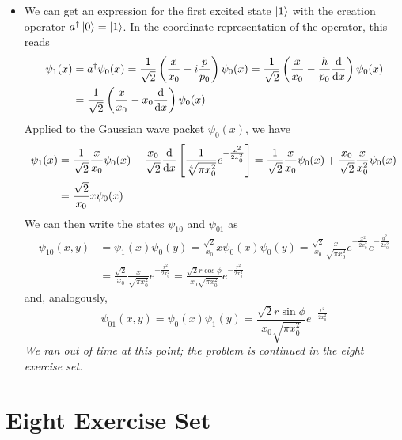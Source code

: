 \documentclass[11pt, a4paper]{article}
\begin{document}
\begin{itemize}
	\item We can get an expression for the first excited state $ \ket{1} $ with the creation operator $ a^{\dagger}\ket{0} = \ket{1} $. In the coordinate representation of the operator, this reads
	\begin{align*}
		\psi_{1}(x) &= a^{\dagger}\psi_{0}(x) = \frac{1}{\sqrt{2}}\left(\frac{x}{x_{0}}-i\frac{p}{p_{0}}\right)\psi_{0}(x)  = \frac{1}{\sqrt{2}}\left(\frac{x}{x_{0}}-\frac{\hbar}{p_{0}}\dv{x}\right)\psi_{0}(x) \\
		& = \frac{1}{\sqrt{2}}\left(\frac{x}{x_{0}}-x_{0}\dv{x}\right)\psi_{0}(x)
	\end{align*}
	Applied to the Gaussian wave packet $ \psi_{0}(x) $, we have
	\begin{align*}
		\psi_{1}(x) &= \frac{1}{\sqrt{2}}\frac{x}{x_{0}}\psi_{0}(x) - \frac{x_{0}}{\sqrt{2}}\dv{x}\left[\frac{1}{\sqrt[4]{\pi x_{0}^{2}}}e^{-\frac{x^{2}}{2x_{0}^{2}}}\right] = \frac{1}{\sqrt{2}}\frac{x}{x_{0}}\psi_{0}(x) + \frac{x_{0}}{\sqrt{2}}\frac{x}{x_{0}^{2}}\psi_{0}(x)\\
		&=\frac{\sqrt{2}}{x_{0}}x\psi_{0}(x)
	\end{align*}
	We can then write the states $ \psi_{10} $ and $ \psi_{01} $ as
	\begin{align*}
		\psi_{10}(x, y) &= \psi_{1}(x)\psi_{0}(y) = \frac{\sqrt{2}}{x_{0}}x\psi_{0}(x)\psi_{0}(y) = \frac{\sqrt{2}}{x_{0}} \frac{x}{\sqrt{\pi x_{0}^{2}}}e^{-\frac{x^{2}}{2x_{0}^{2}}} e^{-\frac{y^{2}}{2x_{0}^{2}}}\\
		&=\frac{\sqrt{2}}{x_{0}}\frac{x}{\sqrt{\pi x_{0}^{2}}} e^{-\frac{r^{2}}{2x_{0}^{2}}} = \frac{\sqrt{2}r \cos \phi}{x_{0}\sqrt{\pi x_{0}^{2}}}e^{-\frac{r^{2}}{2x_{0}^{2}}}
	\end{align*}
	and, analogously, 
	\begin{equation*}
		\psi_{01}(x, y) = \psi_{0}(x)\psi_{1}(y) = \frac{\sqrt{2}r \sin \phi}{x_{0}\sqrt{\pi x_{0}^{2}}}e^{-\frac{r^{2}}{2x_{0}^{2}}}
	\end{equation*}
	\textit{We ran out of time at this point; the problem is continued in the eight exercise set.}
	
\end{itemize}

\section{Eight Exercise Set}
\end{document}
